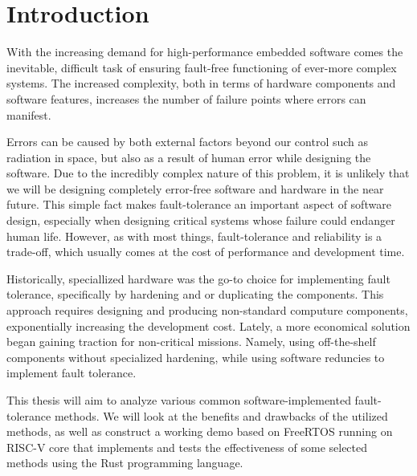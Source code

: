 \section{Introduction}

With the increasing demand for high-performance embedded software comes the inevitable, difficult task of ensuring fault-free functioning of ever-more complex systems. The increased complexity, both in terms of hardware components and software features, increases the number of failure points where errors can manifest.

Errors can be caused by both external factors beyond our control such as radiation in space, but also as a result of human error while designing the software. Due to the incredibly complex nature of this problem, it is unlikely that we will be designing completely error-free software and hardware in the near future. This simple fact makes fault-tolerance an important aspect of software design, especially when designing critical systems whose failure could endanger human life. However, as with most things, fault-tolerance and reliability is a trade-off, which usually comes at the cost of performance and development time.

Historically, speciallized hardware was the go-to choice for implementing fault tolerance, specifically by hardening and or duplicating the components. This approach requires designing and producing non-standard computure components, exponentially increasing the development cost. Lately, a more economical solution began gaining traction for non-critical missions. Namely, using off-the-shelf components without specialized hardening, while using software reduncies to implement fault tolerance.

This thesis will aim to analyze various common software-implemented fault-tolerance methods. We will look at the benefits and drawbacks of the utilized methods, as well as construct a working demo based on FreeRTOS running on RISC-V core that implements and tests the effectiveness of some selected methods using the Rust programming language.

